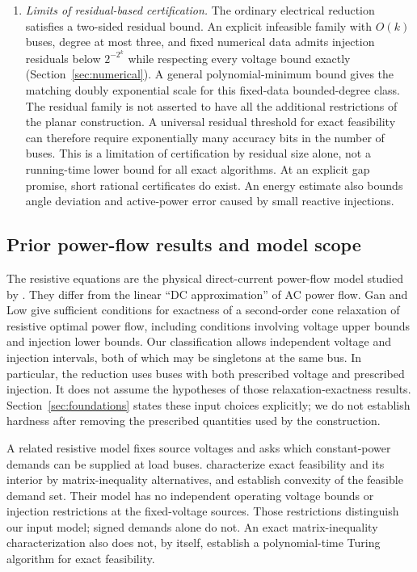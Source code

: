 \begin{enumerate}
\item \emph{Limits of residual-based certification.}
The ordinary electrical reduction satisfies a two-sided residual bound.
An explicit infeasible family with $O(k)$ buses, degree at most three, and
fixed numerical data admits injection residuals below $2^{-2^k}$ while
respecting every voltage bound exactly (Section~\ref{sec:numerical}).
A general polynomial-minimum bound gives the matching doubly exponential
scale for this fixed-data bounded-degree class. The residual family is not
asserted to have all the additional restrictions of the planar construction.
A universal residual threshold for exact feasibility can therefore require
exponentially many accuracy bits in the number of buses. This is a limitation
of certification by residual size alone, not a running-time lower bound for
all exact algorithms. At an explicit gap promise, short rational certificates
do exist. An energy estimate also bounds angle deviation and active-power
error caused by small reactive injections.
\end{enumerate}

\subsection{Prior power-flow results and model scope}

The resistive equations are the physical direct-current power-flow model
studied by \citet{GanLow2014}. They differ from the linear ``DC
approximation'' of AC power flow. Gan and Low give sufficient conditions for
exactness of a second-order cone relaxation of resistive optimal power flow,
including conditions involving voltage upper bounds and injection lower
bounds. Our classification allows independent voltage and injection
intervals, both of which may be singletons at the same bus. In particular,
the reduction uses buses with both prescribed voltage and prescribed
injection. It does not assume the hypotheses of those relaxation-exactness
results. Section~\ref{sec:foundations} states these input choices explicitly;
we do not establish hardness after removing the prescribed quantities used
by the construction.

A related resistive model fixes source voltages and asks which
constant-power demands can be supplied at load buses.
\citet[Theorem 3.22]{JeeningaEtAl2023} characterize exact feasibility and
its interior by matrix-inequality alternatives, and establish convexity of
the feasible demand set. Their model has no independent operating voltage
bounds or injection restrictions at the fixed-voltage sources. Those
restrictions distinguish our input model; signed demands alone do not.
An exact matrix-inequality characterization also does not, by itself,
establish a polynomial-time Turing algorithm for exact feasibility.

